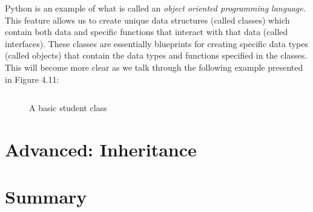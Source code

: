 \documentclass{book}
\begin{document}
Python is an example of what is called an \textit{object oriented programming language}. This feature allows us to create unique data structures (called classes) which contain both data and specific functions that interact with that data (called interfaces). These classes are essentially blueprints for creating specific data types (called objects) that contain the data types and functions specified in the classes. This will become more clear as we talk through the following example presented in Figure 4.11:

\begin{figure}[h]
	\caption{A basic student class}
	\begin{lstlisting}
	\end{lstlisting}

\end{figure}


\section{Advanced: Inheritance}
\section{Summary}
\end{document}
